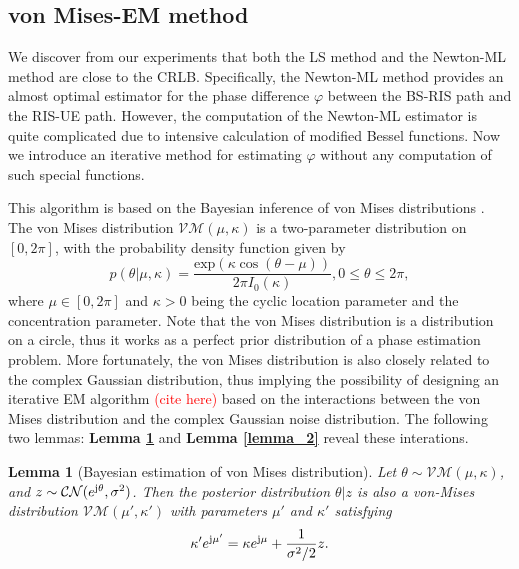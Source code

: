 \documentclass[12pt,draftclsnofoot,journal,onecolumn]{IEEEtran}
\newtheorem{lemma}{\bf Lemma}
\theoremstyle{nonumberplain}
\def \exp {\text{exp}}
\def \CN {\mathcal{CN}}
\def \VM {\mathcal{VM}}
\def \ch {\textcolor{red}{(cite here) }}
\begin{document}
\subsection{von Mises-EM method}    \label{von Mises-EM method}
    We discover from our experiments that both the LS method and the Newton-ML method are close to the CRLB. Specifically, the Newton-ML method provides an almost optimal estimator for the phase difference $\varphi$ between the BS-RIS path and the RIS-UE path. However, the computation of the Newton-ML estimator is quite complicated due to intensive calculation of modified Bessel functions. Now we introduce an iterative method for estimating $\varphi$ without any computation of such special functions.

    This algorithm is based on the Bayesian inference of von Mises distributions \cite{mardia1976bayesian}. The von Mises distribution $\VM(\mu, \kappa)$ is a two-parameter distribution on $[0, 2\pi]$, with the probability density function given by 
    \begin{equation}
        p(\theta|\mu, \kappa) = \frac{\exp(\kappa \cos(\theta - \mu))}{2\pi I_0(\kappa)}, 0\leq \theta \leq 2\pi,
    \end{equation}
    where $\mu \in [0,2\pi]$ and $\kappa >0$ being the cyclic location parameter and the concentration parameter. Note that the von Mises distribution is a distribution on a circle, thus it works as a perfect prior distribution of a phase estimation problem. More fortunately, the von Mises distribution is also closely related to the complex Gaussian distribution, thus implying the possibility of designing an iterative EM algorithm \ch based on the interactions between the von Mises distribution and the complex Gaussian noise distribution. The following two lemmas: {\bf Lemma \ref{lemma_1}} and {\bf Lemma \ref{lemma_2}} reveal these interations. 
    \begin{lemma}[Bayesian estimation of von Mises distribution]\label{lemma_1}
        Let $\theta \sim \VM(\mu, \kappa)$, and $z \sim \CN(e^{{\rm j}\theta}, \sigma^2)$. Then the posterior distribution $\theta | z$ is also a von-Mises distribution $\VM(\mu', \kappa')$ with parameters $\mu'$ and $\kappa'$ satisfying
        \begin{equation}
            \kappa' e^{{\rm j}\mu'} = \kappa e^{{\rm j}\mu} + \frac{1}{\sigma^2/2}z.
        \end{equation}
    \end{lemma}
\end{document}
